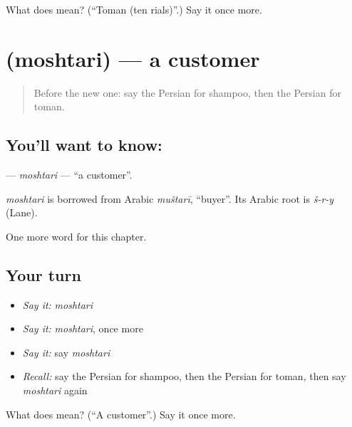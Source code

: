 \begin{tcolorbox}[breakable,colback=teal!4,colframe=teal!35!black,title={Before you move on}]
What does  mean? (\textquotedblleft{}Toman (ten rials)\textquotedblright{}.) Say it once more.
\end{tcolorbox}
\section[\texorpdfstring{\fa{مشتری} (moshtari)}{مشتری (moshtari)}]{ (moshtari) — a customer}

\label{lesson:FA-C166-moshtari}



\begin{quote}
Before the new one: say the Persian for shampoo, then the Persian for toman.
\end{quote}

\subsection*{You'll want to know: }
\textbf{} — \emph{moshtari} — \textquotedblleft{}a customer\textquotedblright{}.

\begin{cousinweb}
\emph{moshtari} is borrowed from Arabic \emph{muštarī}, \textquotedblleft{}buyer\textquotedblright{}. Its Arabic root is \emph{š-r-y} (Lane).
\end{cousinweb}

\begin{grammarlens}[title={What you've built}]
One more word for this chapter.
\end{grammarlens}

\subsection*{Your turn}
\begin{itemize}
\raggedright
  \item \emph{Say it:} \emph{moshtari}
  \item \emph{Say it:} \emph{moshtari}, once more
  \item \emph{Say it:} say \emph{moshtari}
  \item \emph{Recall:} say the Persian for shampoo, then the Persian for toman, then say \emph{moshtari} again
\end{itemize}

\begin{tcolorbox}[breakable,colback=teal!4,colframe=teal!35!black,title={Before you move on}]
What does  mean? (\textquotedblleft{}A customer\textquotedblright{}.) Say it once more.
\end{tcolorbox}
